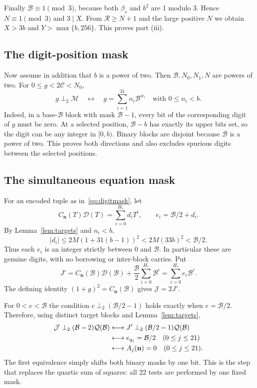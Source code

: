 \documentclass[11pt,letterpaper]{article}
\theoremstyle{definition}\newtheorem{definition}[theorem]{Definition}
\theoremstyle{remark}\newtheorem{remark}[theorem]{Remark}
\newcommand{\cB}{\mathcal B}
\newcommand{\cC}{\mathcal C}
\newcommand{\cD}{\mathcal D}
\newcommand{\cJ}{\mathcal J}
\newcommand{\cM}{\mathcal M}
\newcommand{\cQ}{\mathcal Q}
\newcommand{\cR}{\mathcal R}
\begin{document}
Finally $\cB\equiv1\pmod3$, because both $\beta_s$ and $b^2$ are 1 modulo 3. Hence $N\equiv1\pmod3$ and $3\mid X$. From $\cR\ge N+1$ and the large positive $N$ we obtain $X>3b$ and $Y>\max\{b,256\}$. This proves part (iii).

\subsection{The digit-position mask}

Now assume in addition that $b$ is a power of two. Then $\cB,N_0,N_1,N$ are powers of two. For $0\le g<2\cC<N_0$,
\begin{equation}\label{eq:digitmask}
 g\perp_2\cM
 \quad\longleftrightarrow\quad
 g=\sum_{i=1}^{31}n_i\cB^{w_i}\quad\text{with }0\le n_i<b.
\end{equation}
Indeed, in a base-$\cB$ block with mask $\cB-1$, every bit of the corresponding digit of $g$ must be zero. At a selected position, $\cB-b$ has exactly its upper bits set, so the digit can be any integer in $[0,b)$. Binary blocks are disjoint because $\cB$ is a power of two. This proves both directions and also excludes spurious digits between the selected positions.

\subsection{The simultaneous equation mask}

For an encoded tuple as in~\eqref{eq:digitmask}, let
\[
 C_{\mathbf n}(T)\cD(T)=\sum_{i=0}^{H_*}d_iT^i,
 \qquad e_i=\cB/2+d_i.
\]
By Lemma~\ref{lem:targets} and $n_i<b$,
\[
 |d_i|\le2M(1+31(b-1))^2<2M(33b)^2<\cB/2.
\]
Thus each $e_i$ is an integer strictly between 0 and $\cB$. In particular these are genuine digits, with no borrowing or inter-block carries. Put
\[
 J'=C_{\mathbf n}(\cB)\cD(\cB)+\frac{\cB}{2}\sum_{i=0}^{H_*}\cB^i
    =\sum_{i=0}^{H_*}e_i\cB^i.
\]
The defining identity $(1+g)^2=C_{\mathbf n}(\cB)$ gives $\cJ=2J'$.

For $0<e<\cB$ the condition $e\perp_2(\cB/2-1)$ holds exactly when $e=\cB/2$. Therefore, using distinct target blocks and Lemma~\ref{lem:targets},
\begin{align}
 \cJ\perp_2(\cB-2)\cQ(\cB)
 &\longleftrightarrow J'\perp_2(\cB/2-1)\cQ(\cB)\notag\\
 &\longleftrightarrow e_{q_j}=\cB/2\quad(0\le j\le21)\notag\\
 &\longleftrightarrow A_j(\mathbf n)=0\quad(0\le j\le21).
 \label{eq:alltargets}
\end{align}
The first equivalence simply shifts both binary masks by one bit. This is the step that replaces the quartic sum of squares: all 22 tests are performed by one fixed mask.
\end{document}
